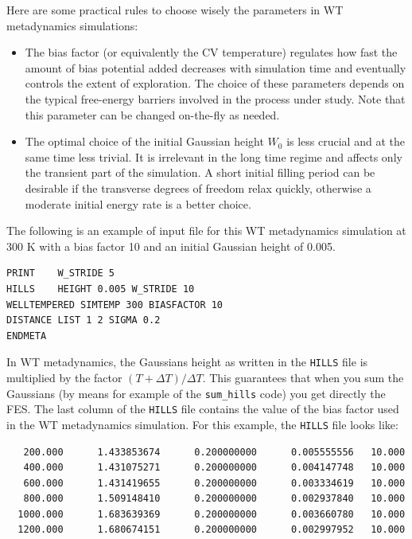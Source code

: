 \documentclass[12pt,a4paper]{article}
\begin{document}
Here are some practical rules to choose wisely the parameters in WT metadynamics simulations:

\begin{itemize}
\item The bias factor (or equivalently the CV temperature) regulates how fast the amount of bias potential added decreases with simulation time and eventually controls the extent of exploration. The choice of these parameters depends on the typical free-energy barriers involved in the process under study. Note that this parameter can be changed on-the-fly as needed.
\item The optimal choice of the initial Gaussian height $W_{0}$ is less crucial and at the same time less trivial. It is irrelevant in the long time regime and affects only the transient part of the simulation. A short initial filling period can be desirable if the transverse degrees of freedom relax quickly, otherwise a moderate initial energy rate is a better choice.
\end{itemize}

The following is an example of input file for this WT metadynamics simulation at 300 K with a bias factor 10 and an initial Gaussian height of 0.005.

\begin{verbatim}
PRINT    W_STRIDE 5
HILLS    HEIGHT 0.005 W_STRIDE 10
WELLTEMPERED SIMTEMP 300 BIASFACTOR 10
DISTANCE LIST 1 2 SIGMA 0.2
ENDMETA
\end{verbatim}

In WT metadynamics, the Gaussians height as written in the \texttt{HILLS} file is multiplied by the factor $(T + \Delta T) / \Delta T$. This guarantees that when you sum the Gaussians (by means for example of the \texttt{sum\_hills} code) you get directly the FES. The last column of the \texttt{HILLS} file contains the value of the bias factor used in the WT metadynamics simulation. For this example, the \texttt{HILLS} file looks like:

\begin{verbatim}
   200.000      1.433853674      0.200000000      0.005555556   10.000 
   400.000      1.431075271      0.200000000      0.004147748   10.000 
   600.000      1.431419655      0.200000000      0.003334619   10.000 
   800.000      1.509148410      0.200000000      0.002937840   10.000 
  1000.000      1.683639369      0.200000000      0.003660780   10.000 
  1200.000      1.680674151      0.200000000      0.002997952   10.000 
\end{verbatim}
\end{document}
